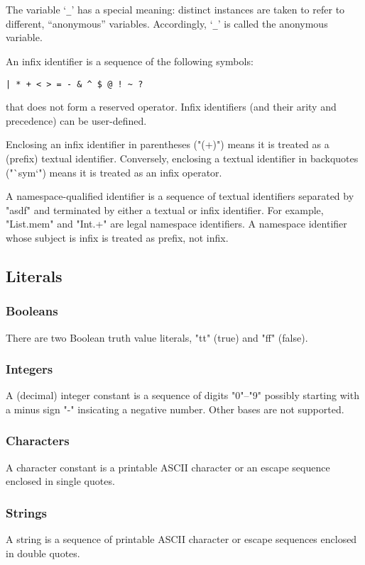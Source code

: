 \documentclass[draft,12pt]{report}
\begin{document}
The variable `\verb|_|' has a special meaning: distinct instances are
taken to refer to different, ``anonymous'' variables.  Accordingly,
`\verb|_|' is called the anonymous variable.

An infix identifier is a sequence of the following symbols:
\begin{verbatim}
| * + < > = - & ^ $ @ ! ~ ?
\end{verbatim}%
that does not form a reserved operator.  Infix identifiers (and their
arity and precedence) can be user-defined.

Enclosing an infix identifier in parentheses ("(+)") means it is
treated as a (prefix) textual identifier.  Conversely, enclosing a
textual identifier in backquotes ("`sym`") means it is treated as an
infix operator.

A namespace-qualified identifier is a sequence of textual identifiers
separated by "asdf" and terminated by either a textual or infix
identifier.  For example, "List.mem" and "Int.+" are legal namespace
identifiers.  A namespace identifier whose subject is infix is treated
as prefix, not infix.



\subsection{Literals}

\subsubsection{Booleans}
There are two Boolean truth value literals, "tt" (true) and "ff"
(false).
\subsubsection{Integers}
A (decimal) integer constant is a sequence of digits "0"--"9" possibly
starting with a minus sign "-" insicating a negative number.  Other
bases are not supported.

\subsubsection{Characters}
A character constant is a printable ASCII character or an escape
sequence enclosed in single quotes.
\subsubsection{Strings}
A string is a sequence of printable ASCII character or escape
sequences enclosed in double quotes.
\end{document}
